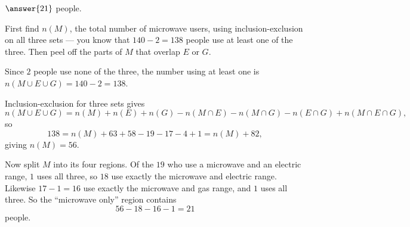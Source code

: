 \documentclass[12pt]{ximera}
\begin{document}
\begin{problem}
\begin{prompt}
$\answer{21}$ people.

\begin{hint}
First find $n(M)$, the total number of microwave users, using inclusion-exclusion on
all three sets --- you know that $140-2=138$ people use at least one of the three.
Then peel off the parts of $M$ that overlap $E$ or $G$.
\end{hint}

\begin{feedback}
Since $2$ people use none of the three, the number using at least one is
$n(M\cup E\cup G)=140-2=138$.

Inclusion-exclusion for three sets gives
\[
n(M\cup E\cup G)=n(M)+n(E)+n(G)-n(M\cap E)-n(M\cap G)-n(E\cap G)+n(M\cap E\cap G),
\]
so
\[
138 = n(M) + 63 + 58 - 19 - 17 - 4 + 1 = n(M) + 82,
\]
giving $n(M)=56$.

Now split $M$ into its four regions. Of the $19$ who use a microwave and an electric
range, $1$ uses all three, so $18$ use exactly the microwave and electric range.
Likewise $17-1=16$ use exactly the microwave and gas range, and $1$ uses all three.
So the ``microwave only'' region contains
\[ 56 - 18 - 16 - 1 = 21 \]
people.
\end{feedback}
\end{prompt}
\end{problem}
\end{document}
